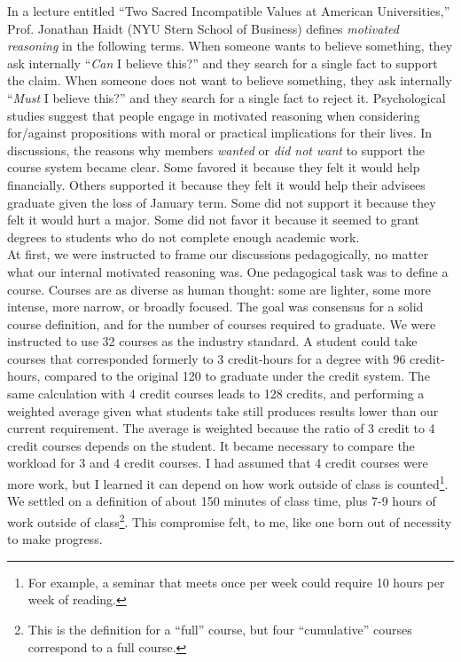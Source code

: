 \documentclass[../../../main.tex]{subfiles}
\begin{document}
In a lecture entitled ``Two Sacred Incompatible Values at American Universities,'' \cite{haidt} Prof. Jonathan Haidt (NYU Stern School of Business) defines \textit{motivated reasoning} in the following terms.  When someone wants to believe something, they ask internally ``\textit{Can} I believe this?'' and they search for a single fact to support the claim.  When someone does not want to believe something, they ask internally ``\textit{Must} I believe this?'' and they search for a single fact to reject it.  Psychological studies suggest that people engage in motivated reasoning when considering for/against propositions with moral or practical implications for their lives.  In discussions, the reasons why members \textit{wanted} or \textit{did not want} to support the course system became clear.  Some favored it because they felt it would help financially.  Others supported it because they felt it would help their advisees graduate given the loss of January term.  Some did not support it because they felt it would hurt a major.  Some did not favor it because it seemed to grant degrees to students who do not complete enough academic work.  
\\
\vspace{0.15cm}
At first, we were instructed to frame our discussions pedagogically, no matter what our internal motivated reasoning was.  One pedagogical task was to define a course.  Courses are as diverse as human thought: some are lighter, some more intense, more narrow, or broadly focused.  The goal was consensus for a solid course definition, and for the number of courses required to graduate.  We were instructed to use 32 courses as the industry standard.  A student could take courses that corresponded formerly to 3 credit-hours for a degree with 96 credit-hours, compared to the original 120 to graduate under the credit system.  The same calculation with 4 credit courses leads to 128 credits, and performing a weighted average given what students take still produces results lower than our current requirement.  The average is weighted because the ratio of 3 credit to 4 credit courses depends on the student.  It became necessary to compare the workload for 3 and 4 credit courses.  I had assumed that 4 credit courses were more work, but I learned it can depend on how work outside of class is counted\footnote{For example, a seminar that meets once per week could require 10 hours per week of reading.}.  We settled on a definition of about 150 minutes of class time, plus 7-9 hours of work outside of class\footnote{This is the definition for a ``full'' course, but four ``cumulative'' courses correspond to a full course.}.  This compromise felt, to me, like one born out of necessity to make progress.
\end{document}
